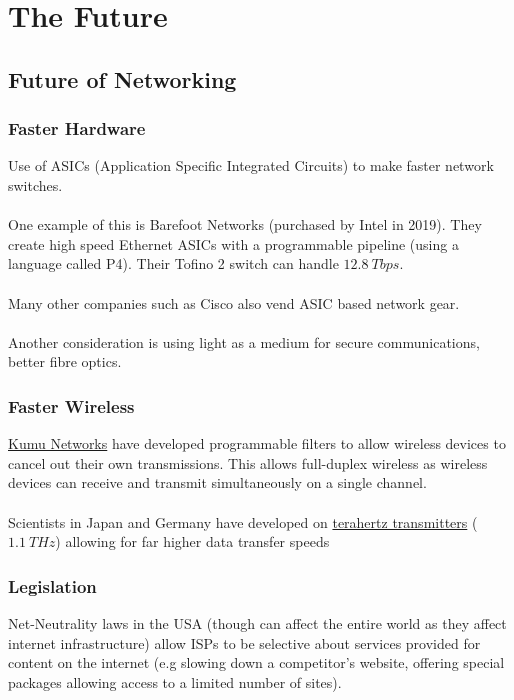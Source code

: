 \chapter{The Future}

\section{Future of Networking}

\subsection{Faster Hardware}
Use of ASICs (Application Specific Integrated Circuits) to make faster network switches.
\\
\\ One example of this is Barefoot Networks (purchased by Intel in 2019). They
create high speed Ethernet ASICs with a programmable pipeline (using a language called P4).
Their Tofino 2 switch can handle $12.8 \ Tbps$.
\\
\\ Many other companies such as Cisco also vend ASIC based network gear.
\\
\\ Another consideration is using light as a medium for secure communications, better fibre optics.

\subsection{Faster Wireless}
\href{https://kumunetworks.com/}{Kumu Networks} have developed programmable filters to
allow wireless devices to cancel out their own transmissions. This allows full-duplex
wireless as wireless devices can receive and transmit simultaneously on a single channel.
\\
\\ Scientists in Japan and Germany have developed on \href{https://spectrum.ieee.org/recordsetting-terahertz-transmitters}{terahertz transmitters} ($1.1 \ THz$) allowing for far higher data transfer speeds

\subsection{Legislation}
Net-Neutrality laws in the USA (though can affect the entire world as they affect internet infrastructure) allow ISPs
to be selective about services provided for content on the internet (e.g slowing down a competitor's website,
offering special packages allowing access to a limited number of sites).

